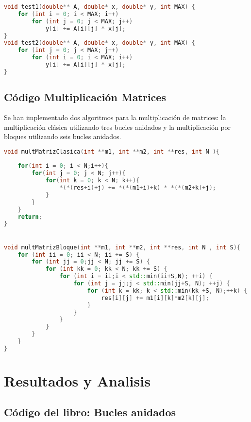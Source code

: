 \documentclass[conference]{IEEEtran}
\begin{document}
\begin{lstlisting}[language=C++]
void test1(double** A, double* x, double* y, int MAX) {
    for (int i = 0; i < MAX; i++)
        for (int j = 0; j < MAX; j++)
            y[i] += A[i][j] * x[j];
}
void test2(double** A, double* x, double* y, int MAX) {
    for (int j = 0; j < MAX; j++)
        for (int i = 0; i < MAX; i++)
            y[i] += A[i][j] * x[j];
}
\end{lstlisting}
\subsection{\textbf{Código Multiplicación Matrices}}
Se han implementado dos algoritmos para la multiplicación de matrices: la multiplicación clásica utilizando tres bucles anidados y la multiplicación por bloques utilizando seis bucles anidados.
\begin{lstlisting}[language=C++]
void multMatrizClasica(int **m1, int **m2, int **res, int N ){
   
    for(int i = 0; i < N;i++){
        for(int j = 0; j < N; j++){
            for(int k = 0; k < N; k++){
                *(*(res+i)+j) += *(*(m1+i)+k) * *(*(m2+k)+j);
            }
        }
    }
    return;
}


void multMatrizBloque(int **m1, int **m2, int **res, int N , int S){
    for (int ii = 0; ii < N; ii += S) {
        for (int jj = 0;jj < N; jj += S) {
            for (int kk = 0; kk < N; kk += S) {
                for (int i = ii;i < std::min(ii+S,N); ++i) {
                    for (int j = jj;j < std::min(jj+S, N); ++j) {
                        for (int k = kk; k < std::min(kk +S, N);++k) {
                            res[i][j] += m1[i][k]*m2[k][j];
                        }
                    }
                }
            }
        }
    }
}
\end{lstlisting}


\section{Resultados y Analisis}
\subsection{\textbf{Código del libro: Bucles anidados}}
\end{document}
